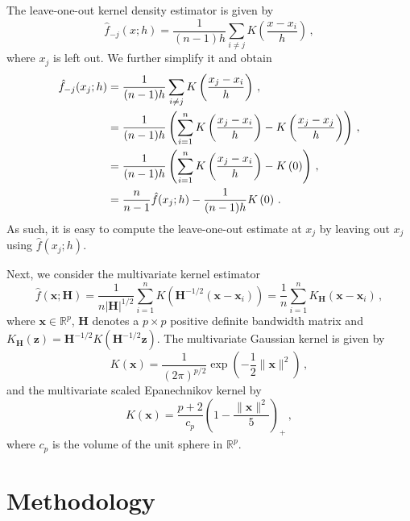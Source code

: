 \documentclass[11pt,a4paper,]{article}
\theoremstyle{definition}
\theoremstyle{definition}
\theoremstyle{definition}
\theoremstyle{remark}
\begin{document}
The leave-one-out kernel density estimator is given by
\begin{equation}\label{eq:kde9}
    \hat{f}_{-j}(x;h) = \frac{1}{(n-1)h}\sum_{i \neq j} K\left(\frac{x-x_i}{h}\right)\, ,  
\end{equation}
where \(x_j\) is left out. We further simplify it and obtain
\begin{align}\label{eq:kde10}
    \hat{f}_{-j}(x_j;h) & = \frac{1}{(n-1)h}\sum_{i \neq j} K\left(\frac{x_j-x_i}{h}\right)\, , \notag \\
    & = \frac{1}{(n-1)h} \left(\sum_{i = 1}^n K\left(\frac{x_j-x_i}{h}\right) - K\left(\frac{x_j-x_j}{h}\right)  \right) \, , \notag  \\
    & = \frac{1}{(n-1)h} \left(\sum_{i = 1}^n K\left(\frac{x_j-x_i}{h}\right) - K\left(0\right)  \right) \, , \notag  \\
    & = \frac{n}{n-1} \hat{f}(x_j;h) - \frac{1}{(n-1)h} K\left(0\right) \, .
\end{align}
As such, it is easy to compute the leave-one-out estimate at \(x_j\) by leaving out \(x_j\) using \(\hat{f}(x_j;h)\).

Next, we consider the multivariate kernel estimator
\begin{equation}\label{eq:kde6}
    \hat{f}\left(\bm{x}; \bm{H}\right) = \frac{1}{n|\bm{H}|^{1/2}} \sum_{i=1}^n K\left(\bm{H}^{-1/2}(\bm{x} -\bm{x}_i) \right) = \frac{1}{n} \sum_{i=1}^n K_{\bm{H}}\left(\bm{x} -\bm{x}_i \right)\, ,
\end{equation}
where \(\mathbf{x} \in \mathbb{R}^p\), \(\bm{H}\) denotes a \(p \times p\) positive definite bandwidth matrix and \(K_{\bm{H}}(\bm{z}) = \bm{H}^{-1/2} K(\bm{H}^{-1/2} \bm{z})\). The multivariate Gaussian kernel is given by
\begin{equation}\label{eq:kde7}
    K(\bm{x}) = \frac{1}{(2\pi)^{p/2}} \exp\left( -\frac{1}{2} \| \bm{x} \| ^2\right)\, , 
\end{equation}
and the multivariate scaled Epanechnikov kernel by
\begin{equation}\label{eq:kde8}
    K(\bm{x}) = \frac{p+2}{c_p}\left(1 - \frac{\| \bm{x} \| ^2}{5} \right)_+ \, , 
\end{equation}
where \(c_p\) is the volume of the unit sphere in \(\mathbb{R}^p\).

\hypertarget{methodology}{%
\section{\texorpdfstring{Methodology \label{sec:lookout}}{Methodology }}\label{methodology}}
\end{document}
